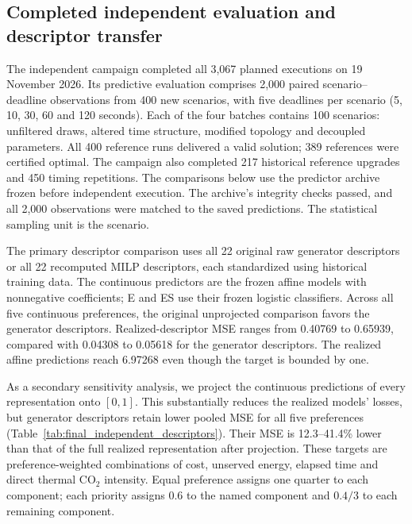 
\subsection{Completed independent evaluation and descriptor transfer}
\label{sec:final_independent_descriptors}
The independent campaign completed all 3,067 planned executions on
19 November 2026. Its predictive evaluation comprises 2,000 paired
scenario--deadline observations from 400 new scenarios, with five deadlines
per scenario (5, 10, 30, 60 and 120 seconds). Each of the four batches
contains 100 scenarios: unfiltered draws, altered time structure, modified
topology and decoupled parameters. All 400 reference runs delivered a valid
solution; 389 references were certified optimal. The campaign also completed
217 historical reference upgrades and 450 timing repetitions. The comparisons
below use the predictor archive frozen before independent execution. The
archive's integrity checks passed, and all 2,000 observations were matched to
the saved predictions. The statistical sampling unit is the scenario.

The primary descriptor comparison uses all 22 original raw generator
descriptors or all 22 recomputed MILP descriptors, each standardized using
historical training data. The continuous predictors are the frozen affine
models with nonnegative coefficients; E and ES use their frozen logistic
classifiers. Across all five continuous preferences, the original
unprojected comparison favors the generator descriptors. Realized-descriptor
MSE ranges from 0.40769 to 0.65939, compared with 0.04308 to 0.05618 for the
generator descriptors. The realized affine predictions reach 6.97268 even
though the target is bounded by one.

As a secondary sensitivity analysis, we project the continuous predictions
of every representation onto $[0,1]$. This substantially reduces the realized
models' losses, but generator descriptors retain lower pooled MSE for all
five preferences (Table~\ref{tab:final_independent_descriptors}). Their MSE
is 12.3--41.4\% lower than that of the full realized representation after
projection. These targets are preference-weighted combinations of cost,
unserved energy, elapsed time and direct thermal CO$_2$ intensity. Equal
preference assigns one quarter to each component; each priority assigns
0.6 to the named component and $0.4/3$ to each remaining component.

